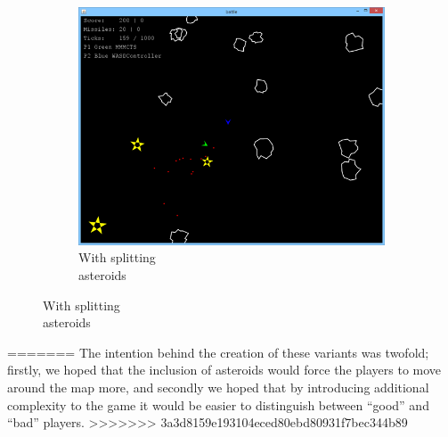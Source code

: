 \begin{figure}
	\begin{subfigure}[b]{0.15\textwidth}
		\center
		\includegraphics[scale=0.17]{resources/gamemode0}
		\caption{With splitting\\asteroids}
	\end{subfigure}
\end{figure}
	
=======
The intention behind the creation of these variants was twofold; firstly, we hoped that the inclusion of asteroids would force the players to move around the map more, and secondly we hoped that by introducing additional complexity to the game it would be easier to distinguish between “good” and “bad” players.
>>>>>>> 3a3d8159e193104eced80ebd80931f7bec344b89
